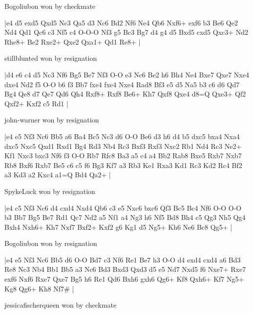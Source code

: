 \showboard

Bogoliubon won by checkmate

\makegametitle
|e4 d5 exd5 Qxd5 Nc3 Qa5 d3 Nc6 Bd2 Nf6 Ne4 Qb6 Nxf6+ exf6 b3 Be6 Qe2 Nd4 Qd1 Qc6 c3 Nf5 c4 O-O-O Nf3 g5 Bc3 Bg7 d4 g4 d5 Bxd5 cxd5 Qxc3+ Nd2 Rhe8+ Be2 Rxe2+ Qxe2 Qxa1+ Qd1 Re8+  |

\showboard

stillblunted won by resignation

\makegametitle
|d4 e6 c4 d5 Nc3 Nf6 Bg5 Be7 Nf3 O-O e3 Nc6 Be2 h6 Bh4 Ne4 Bxe7 Qxe7 Nxe4 dxe4 Nd2 f5 O-O b6 f3 Bb7 fxe4 fxe4 Nxe4 Rad8 Bf3 e5 d5 Na5 b3 c6 d6 Qd7 Bg4 Qe8 d7 Qe7 Qd6 Qh4 Rxf8+ Rxf8 Be6+ Kh7 Qxf8 Qxe4 d8=Q Qxe3+ Qf2 Qxf2+ Kxf2 c5 Rd1  |

\showboard

john-warner won by resignation

\makegametitle
|e4 e5 Nf3 Nc6 Bb5 a6 Ba4 Bc5 Nc3 d6 O-O Be6 d3 h6 d4 b5 dxc5 bxa4 Nxa4 dxc5 Nxc5 Qxd1 Rxd1 Bg4 Rd3 Nb4 Rc3 Bxf3 Rxf3 Nxc2 Rb1 Nd4 Rc3 Ne2+ Kf1 Nxc3 bxc3 Nf6 f3 O-O Rb7 Rfc8 Ba3 a5 c4 a4 Bb2 Rab8 Bxe5 Rxb7 Nxb7 Rb8 Bxf6 Rxb7 Be5 c6 c5 f6 Bg3 Kf7 a3 Rb3 Ke1 Rxa3 Kd1 Rc3 Kd2 Rc4 Bf2 a3 Kd3 a2 Kxc4 a1=Q Bd4 Qa2+  |

\showboard

SpykeLuck won by resignation

\makegametitle
|e4 c5 Nf3 Nc6 d4 cxd4 Nxd4 Qb6 c3 e5 Nxc6 bxc6 Qf3 Bc5 Bc4 Nf6 O-O O-O b3 Bb7 Bg5 Be7 Rd1 Qc7 Nd2 a5 Nf1 a4 Ng3 h6 Nf5 Bd8 Bh4 c5 Qg3 Nh5 Qg4 Bxh4 Nxh6+ Kh7 Nxf7 Bxf2+ Kxf2 g6 Kg1 d5 Ng5+ Kh6 Ne6 Bc8 Qg5+  |

\showboard

Bogoliubon won by resignation

\makegametitle
|e4 e5 Nf3 Nc6 Bb5 d6 O-O Bd7 c3 Nf6 Re1 Be7 h3 O-O d4 exd4 cxd4 a6 Bd3 Re8 Nc3 Nb4 Bb1 Bb5 a3 Nc6 Bd3 Bxd3 Qxd3 d5 e5 Nd7 Nxd5 f6 Nxe7+ Rxe7 exf6 Nxf6 Rxe7 Qxe7 Bg5 h6 Re1 Qd6 Bxh6 gxh6 Qg6+ Kf8 Qxh6+ Kf7 Ng5+ Kg8 Qg6+ Kh8 Nf7\#  |

\showboard

jessicafischerqueen won by checkmate

